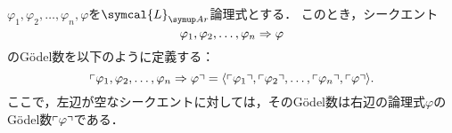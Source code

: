 \begin{Def}[シークエントのGödel数] \label{Def:sequentGodelNumber}
	\(\varphi_1, \varphi_2, \dots, \varphi_n, \varphi\)を\(\symcal{L}_{\Ar}\)論理式とする．
	このとき，シークエント
	\[
		\varphi_1, \varphi_2, \dots, \varphi_n \Rightarrow \varphi
	\]
	のGödel数を以下のように定義する：
	\begin{equation}
		\mathopen{}\left\ulcorner \varphi_1, \varphi_2, \dots, \varphi_n \Rightarrow \varphi \right\urcorner\mathclose{} =
		\langle 
			\mathopen{}\left\ulcorner \varphi_1 \right\urcorner\mathclose{},
			\mathopen{}\left\ulcorner \varphi_2 \right\urcorner\mathclose{},
			\dots,
			\mathopen{}\left\ulcorner \varphi_n \right\urcorner\mathclose{},
			\mathopen{}\left\ulcorner \varphi \right\urcorner\mathclose{}
		 \rangle.
		\label{eq:sequentGodelNumber}
	\end{equation}
	ここで，左辺が空なシークエントに対しては，そのGödel数は右辺の論理式\(\varphi\)のGödel数\(\mathopen{}\left\ulcorner \varphi \right\urcorner\mathclose{}\)である．
\end{Def}


